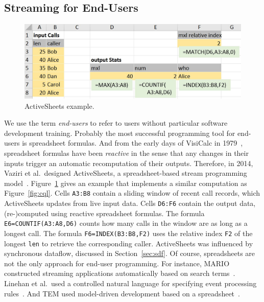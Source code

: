 \subsection{Streaming for End-Users}\label{sec:eup} %

\begin{figure}[!h]
\centerline{\includegraphics[width=\columnwidth]{CallStats.jpg}}
\vspace*{-3mm}
\caption{\label{fig:activesheets}ActiveSheets example.}
\vspace*{-4mm}
\end{figure}

We use the term \emph{end-users} to refer to users without particular
software development training. Probably the most successful
programming tool for end-users is spreadsheet formulas. And from the
early days of VisiCalc in 1979~\cite{bricklin_frankston_1979},
spreadsheet formulas have been \emph{reactive} in the sense that any
changes in their inputs trigger an automatic recomputation of their
outputs. Therefore, in 2014, Vaziri et al.\ designed \textsf{ActiveSheets}, a
spreadsheet-based stream programming model~\cite{vaziri_et_al_2014}.
Figure~\ref{fig:activesheets} gives an example that implements a
similar computation as Figure~\ref{fig:cql}.
Cells \lstinline{A3:B8} contain a sliding window of recent call
records, which ActiveSheets updates from live input data. Cells
\lstinline{D6:F6} contain the output data, \mbox{(re-)}com\-pu\-ted
using reactive spreadsheet formulas. The formula
\mbox{\lstinline{E6=COUNTIF(A3:A8,D6)}} counts how many calls in the
window are as long as a longest call. The formula
\mbox{\lstinline{F6=INDEX(B3:B8,F2)}} uses the relative index \lstinline{F2}
of the longest \lstinline{len} to retrieve the corresponding
caller.  ActiveSheets was influenced by
synchronous dataflow, discussed in Section~\ref{sec:sdf}.
%
Of course, spreadsheets are not the
only approach for end-user programming. For instance,
\textsf{MARIO} constructed streaming applications automatically based
on search terms~\cite{riabov_et_al_2008}.  Linehan et al.\ used a
controlled natural language for specifying event processing
rules~\cite{linehan_et_al_2011}. And \textsf{TEM} used model-driven
development based on a spreadsheet~\cite{etzion_et_al_2016}.
